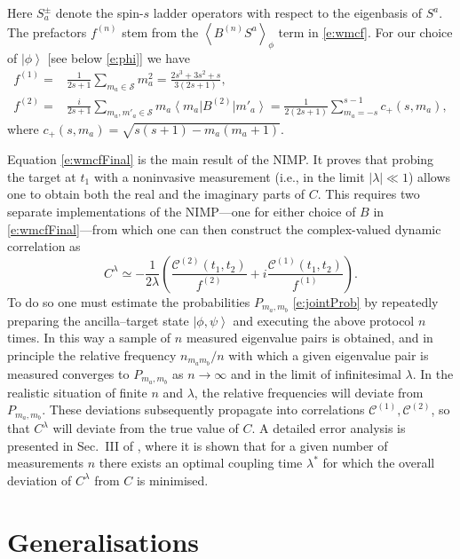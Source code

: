 \documentclass[epjST,numbook]{svjour}
\newcommand{\wmcf}{\mathscr{C}}
\newcommand{\ket}[1]{\left \vert #1 \right >}
\newcommand{\matel}[3]{ \displaystyle \left\langle #1 \right \vert #2 \left\vert  #3 \right\rangle }
\newcommand{\expval}[1]{\left\langle #1 \right\rangle}
\begin{document}
Here $S_a^{\pm}$ denote the spin-$s$ ladder operators with respect to the eigenbasis of $S^a$.
The prefactors $f^{(n)}$ stem from the $\expval{B^{(n)}S^a}_\phi$ term in \eqref{e:wmcf}. For our choice of $\ket{\phi}$ [see below \eqref{e:phi}] we have
\begin{equation}\label{e:deff}
	\begin{split}
		f^{(1)}=&\frac{1}{2s+1}\sum_{m_a\in\mathscr{S}}m_a^2=\frac{2s^3+3s^2+s}{3(2s+1)}, \\
		f^{(2)}=&\frac{i}{2s+1}\sum_{m_a,m'_a\in\mathscr{S}} m_a\matel{m_a}{B^{(2)}}{m'_a}=\frac{1}{2(2s+1)}\sum_{m_a=-s}^{s-1} c_+(s,m_a),
	\end{split}
\end{equation}
where $c_+(s,m_a)=\sqrt{s(s+1)-m_a(m_a+1)}$.

Equation \eqref{e:wmcfFinal} is the main result of the NIMP. It proves that probing the target at $t_1$ with a noninvasive measurement (i.e., in the limit $|\lambda|\ll 1$) allows one to obtain both the real and the imaginary parts of $C$. This requires two separate implementations of the NIMP---one for either choice of $B$ in \eqref{e:wmcfFinal}---from which one can then construct the complex-valued dynamic correlation as
\begin{equation}\label{e:reconstruct}
	C^\lambda \simeq -\frac{1}{2\lambda} \left(\frac{\wmcf^{(2)}(t_1,t_2)}{f^{(2)}} +i \frac{\wmcf^{(1)}(t_1,t_2)}{f^{(1)}} \right).
\end{equation}
To do so one must estimate the probabilities $P_{m_a,m_b}$ \eqref{e:jointProb} by repeatedly preparing the ancilla--target state $\ket{\phi,\psi}$ and executing the above protocol $n$ times. In this way a sample of $n$ measured eigenvalue pairs is obtained, and in principle the relative frequency $n_{m_a m_b}/n$ with which a given eigenvalue pair is measured converges to $P_{m_a,m_b}$ as $n\to\infty$ and in the limit of infinitesimal $\lambda$. In the realistic situation of finite $n$ and $\lambda$, the relative frequencies will deviate from $P_{m_a,m_b}$. These deviations subsequently propagate into correlations $\wmcf^{(1)},\wmcf^{(2)}$, so that $C^\lambda$ will deviate from the true value of $C$.
A detailed error analysis is presented in Sec.~III of \cite{Uhrich_etal}, where it is shown that for a given number of measurements $n$ there exists an optimal coupling time $\lambda^*$ for which the overall deviation of $C^\lambda$ from $C$ is minimised.

\section{Generalisations}
\label{sec:gen}
\end{document}
